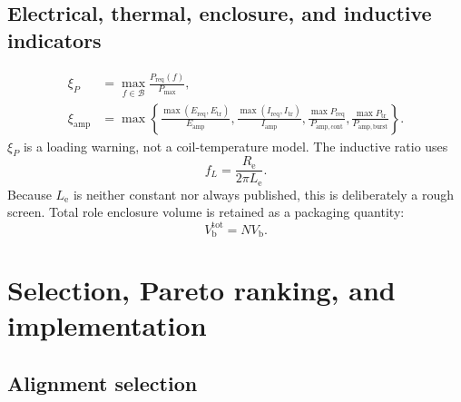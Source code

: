 \documentclass[11pt,a4paper]{article}
\numberwithin{equation}{section}
\renewcommand{\Re}{R_{\mathrm{e}}}
\newcommand{\Le}{L_{\mathrm{e}}}
\newcommand{\Vb}{V_{\mathrm{b}}}
\newcommand{\Pmax}{P_{\mathrm{max}}}
\begin{document}
\subsection{Electrical, thermal, enclosure, and inductive indicators}

\begin{align}
	\xi_P&=
	\max_{f\in\mathcal B}
	\frac{P_{\mathrm{req}}(f)}{\Pmax},
	\label{eq:xip}\\
	\xi_{\mathrm{amp}}&=
	\max\left\{
	\frac{\max(E_{\mathrm{req}},E_{\mathrm{tr}})}{E_{\mathrm{amp}}},
	\frac{\max(I_{\mathrm{req}},I_{\mathrm{tr}})}{I_{\mathrm{amp}}},
	\frac{\max P_{\mathrm{req}}}{P_{\mathrm{amp,cont}}},
	\frac{\max P_{\mathrm{tr}}}{P_{\mathrm{amp,burst}}}
	\right\}.
	\label{eq:xiamp}
\end{align}
$\xi_P$ is a loading warning, not a coil-temperature model.  The inductive
ratio uses
\begin{equation}
	f_L=\frac{\Re}{2\pi\Le}.
	\label{eq:fL}
\end{equation}
Because $\Le$ is neither constant nor always published, this is deliberately
a rough screen.  Total role enclosure volume is retained as a packaging
quantity:
\begin{equation}
	V_{\mathrm b}^{\mathrm{tot}}=N\Vb.
	\label{eq:vbtot}
\end{equation}

\section{Selection, Pareto ranking, and implementation}
\label{sec:procedure}

\subsection{Alignment selection}
\end{document}

